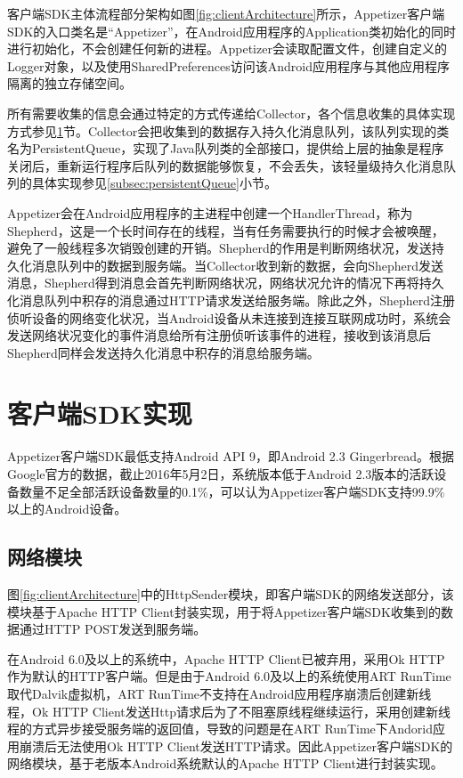 客户端SDK主体流程部分架构如图\ref{fig:clientArchitecture}所示，Appetizer客户端SDK的入口类名是“Appetizer”，在Android应用程序的Application类初始化的同时进行初始化，不会创建任何新的进程。Appetizer会读取配置文件，创建自定义的Logger对象，以及使用SharedPreferences访问该Android应用程序与其他应用程序隔离的独立存储空间。

所有需要收集的信息会通过特定的方式传递给Collector，各个信息收集的具体实现方式参见\ref{sec:clientSDKimplement}节。Collector会把收集到的数据存入持久化消息队列，该队列实现的类名为PersistentQueue，实现了Java队列类的全部接口，提供给上层的抽象是程序关闭后，重新运行程序后队列的数据能够恢复，不会丢失，该轻量级持久化消息队列的具体实现参见\ref{subsec:persistentQueue}小节。

Appetizer会在Android应用程序的主进程中创建一个HandlerThread，称为Shepherd，这是一个长时间存在的线程，当有任务需要执行的时候才会被唤醒，避免了一般线程多次销毁创建的开销。Shepherd的作用是判断网络状况，发送持久化消息队列中的数据到服务端。当Collector收到新的数据，会向Shepherd发送消息，Shepherd得到消息会首先判断网络状况，网络状况允许的情况下再将持久化消息队列中积存的消息通过HTTP请求发送给服务端。除此之外，Shepherd注册侦听设备的网络变化状况，当Android设备从未连接到连接互联网成功时，系统会发送网络状况变化的事件消息给所有注册侦听该事件的进程，接收到该消息后Shepherd同样会发送持久化消息中积存的消息给服务端。

\section{客户端SDK实现}
\label{sec:clientSDKimplement}

Appetizer客户端SDK最低支持Android API 9，即Android 2.3 Gingerbread。根据Google官方的数据，截止2016年5月2日，系统版本低于Android 2.3版本的活跃设备数量不足全部活跃设备数量的0.1\%，可以认为Appetizer客户端SDK支持99.9\%以上的Android设备。

\subsection{网络模块}
\label{subsec:networkModulo}

图\ref{fig:clientArchitecture}中的HttpSender模块，即客户端SDK的网络发送部分，该模块基于Apache HTTP Client封装实现，用于将Appetizer客户端SDK收集到的数据通过HTTP POST发送到服务端。

在Android 6.0及以上的系统中，Apache HTTP Client已被弃用，采用Ok HTTP作为默认的HTTP客户端。但是由于Android 6.0及以上的系统使用ART RunTime取代Dalvik虚拟机，ART RunTime不支持在Android应用程序崩溃后创建新线程，Ok HTTP Client发送Http请求后为了不阻塞原线程继续运行，采用创建新线程的方式异步接受服务端的返回值，导致的问题是在ART RunTime下Andorid应用崩溃后无法使用Ok HTTP Client发送HTTP请求。因此Appetizer客户端SDK的网络模块，基于老版本Android系统默认的Apache HTTP Client进行封装实现。

